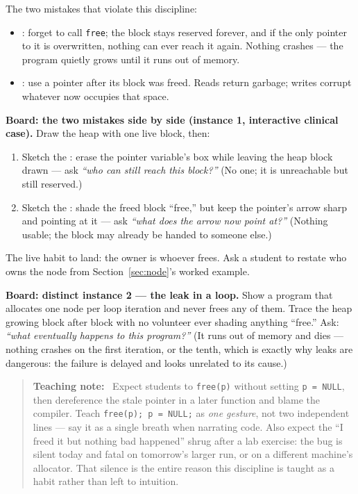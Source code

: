 \documentclass[11pt]{article}
\newenvironment{teachingaside}{\begin{quote}\small\color{primary-gold}\textbf{Teaching note:}\ }{\end{quote}}
\begin{document}
The two mistakes that violate this discipline:
\begin{itemize}
  \item {}: forget to call \texttt{free}; the block stays reserved forever, and if the only pointer to it is overwritten, nothing can ever reach it again. Nothing crashes --- the program quietly grows until it runs out of memory.
  \item {}: use a pointer after its block was freed. Reads return garbage; writes corrupt whatever now occupies that space.
\end{itemize}

\textbf{Board: the two mistakes side by side (instance 1, interactive clinical case).} Draw the heap with one live block, then:
\begin{enumerate}
  \item Sketch the : erase the pointer variable's box while leaving the heap block drawn --- ask \emph{``who can still reach this block?''} (No one; it is unreachable but still reserved.)
  \item Sketch the : shade the freed block ``free,'' but keep the pointer's arrow sharp and pointing at it --- ask \emph{``what does the arrow now point at?''} (Nothing usable; the block may already be handed to someone else.)
\end{enumerate}
The live habit to land: the owner is whoever frees. Ask a student to restate who owns the node from Section~\ref{sec:node}'s worked example.

\textbf{Board: distinct instance 2 --- the leak in a loop.} Show a program that allocates one node per loop iteration and never frees any of them. Trace the heap growing block after block with no volunteer ever shading anything ``free.'' Ask: \emph{``what eventually happens to this program?''} (It runs out of memory and dies --- nothing crashes on the first iteration, or the tenth, which is exactly why leaks are dangerous: the failure is delayed and looks unrelated to its cause.)

\begin{teachingaside}
Expect students to \texttt{free(p)} without setting \texttt{p = NULL}, then dereference the stale pointer in a later function and blame the compiler. Teach \texttt{free(p); p = NULL;} as \emph{one gesture}, not two independent lines --- say it as a single breath when narrating code. Also expect the ``I freed it but nothing bad happened'' shrug after a lab exercise: the bug is silent today and fatal on tomorrow's larger run, or on a different machine's allocator. That silence is the entire reason this discipline is taught as a habit rather than left to intuition.
\end{teachingaside}
\end{document}
